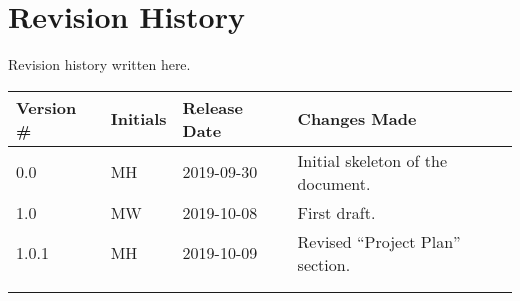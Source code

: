\thispagestyle{empty}
\section*{Revision History}

Revision history written here.

\begin{table}[H]
\begin{tabular}{llll}
\hline
Version \# & Initials & Release Date & Changes Made \\ \hline
0.0 & MH & 2019-09-30 & Initial skeleton of the document.\\
1.0 & MW & 2019-10-08 & First draft.\\
1.0.1 & MH & 2019-10-09 & Revised ``Project Plan'' section.\\
 & & & \\
 & & & \\ \hline
\end{tabular}
\end{table}